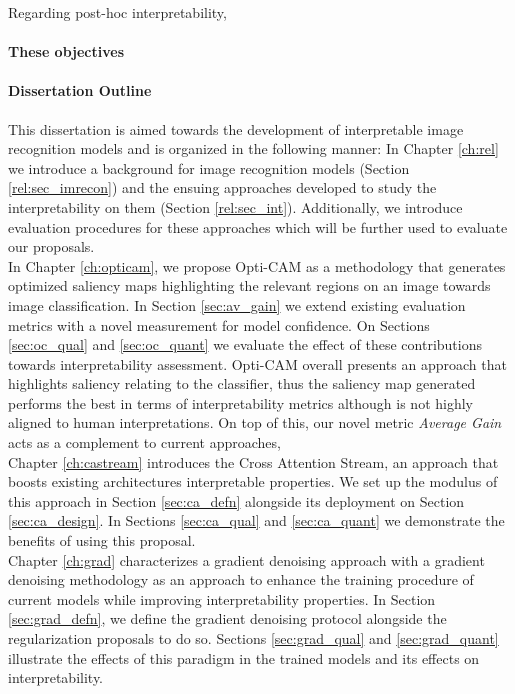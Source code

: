 \noindent Regarding post-hoc interpretability, 


\paragraph{These objectives}
\paragraph{Dissertation Outline}
\noindent This dissertation is aimed towards the development of interpretable image recognition 
models and is organized in the following manner: In Chapter \ref{ch:rel} we 
introduce a background for image recognition models (Section \ref{rel:sec_imrecon}) and the ensuing 
approaches developed to study the interpretability on them (Section \ref{rel:sec_int}). 
Additionally, we introduce evaluation procedures for these approaches which will be further used to 
evaluate our proposals.\\

\noindent In Chapter \ref{ch:opticam}, we propose Opti-CAM as a methodology that generates 
optimized saliency maps highlighting the relevant regions on an image towards image classification. 
In Section \ref{sec:av_gain} we extend existing evaluation metrics with a novel measurement for 
model confidence. On Sections \ref{sec:oc_qual} and \ref{sec:oc_quant} we evaluate the effect of 
these contributions towards interpretability assessment. Opti-CAM overall presents an approach that 
highlights saliency relating to the classifier, thus the saliency map generated performs the best 
in terms of interpretability metrics although is not highly aligned to human interpretations. 
On top of this, our novel metric \emph{Average Gain} acts as a complement to current approaches, \\


\noindent Chapter \ref{ch:castream} introduces the Cross Attention Stream, an approach that boosts 
existing architectures interpretable properties. We set up the modulus of this approach in 
Section \ref{sec:ca_defn} alongside its deployment on Section \ref{sec:ca_design}. 
In Sections \ref{sec:ca_qual} and \ref{sec:ca_quant} we demonstrate the benefits of using this
proposal.\\

\noindent Chapter \ref{ch:grad} characterizes a gradient denoising approach with a gradient denoising 
methodology as an approach to enhance the training procedure of current models while improving 
interpretability properties. In Section \ref{sec:grad_defn}, we define the gradient denoising 
protocol alongside the regularization proposals to do so.
Sections \ref{sec:grad_qual} and \ref{sec:grad_quant} illustrate the effects of this paradigm
in the trained models and its effects on interpretability.\\
    
